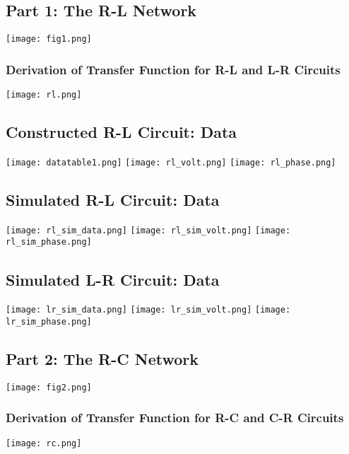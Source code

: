 \documentclass[11pt]{article}
\begin{document}
\subsection*{Part 1: The R-L Network}
\begin{center}
    \texttt{[image: fig1.png]}

    \subsubsection*{Derivation of Transfer Function for R-L and L-R Circuits}
    \texttt{[image: rl.png]}
\end{center}

\newpage

\subsection*{Constructed R-L Circuit: Data}
\begin{center}
    \texttt{[image: datatable1.png]}
    \texttt{[image: rl\_volt.png]}
    \texttt{[image: rl\_phase.png]}
\end{center}

\subsection*{Simulated R-L Circuit: Data}
\begin{center}
    \texttt{[image: rl\_sim\_data.png]}
    \texttt{[image: rl\_sim\_volt.png]}
    \texttt{[image: rl\_sim\_phase.png]}
\end{center}

\newpage

\subsection*{Simulated L-R Circuit: Data}
\begin{center}
    \texttt{[image: lr\_sim\_data.png]}
    \texttt{[image: lr\_sim\_volt.png]}
    \texttt{[image: lr\_sim\_phase.png]}
\end{center}

\newpage

\subsection*{Part 2: The R-C Network}
\begin{center}
    \texttt{[image: fig2.png]}
    \subsubsection*{Derivation of Transfer Function for R-C and C-R Circuits}
    \texttt{[image: rc.png]}
\end{center}
\end{document}
